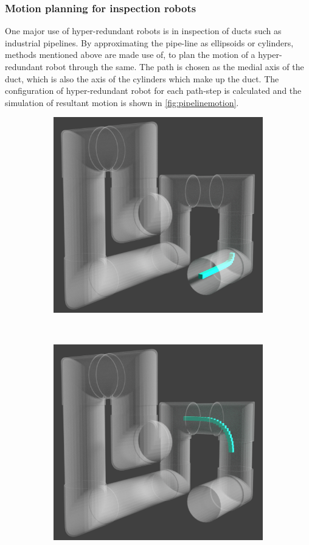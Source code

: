 \documentclass[12pt,a4]{article}
\begin{document}
\subsubsection{Motion planning for inspection robots}
One major use of hyper-redundant robots is in inspection of ducts such as industrial pipelines. By approximating the pipe-line as ellipsoids or cylinders, methods mentioned above are made use of, to plan the motion of a hyper-redundant robot through the same. The path is chosen as the medial axis of the duct, which is also the axis of the cylinders which make up the duct. The configuration of hyper-redundant robot for each path-step is calculated and the simulation of resultant motion is shown in \cref{fig:pipelinemotion}.
\begin{figure}[ht!]
    \centering
    \begin{subfigure}{0.31\textwidth}
        \centering
        \includegraphics[width=0.8\linewidth]{figures/Pipesnaps/1.png}
   
    \end{subfigure}%
    ~
        \begin{subfigure}{0.31\textwidth}
        \centering
        \includegraphics[width=0.8\linewidth]{figures/Pipesnaps/2.png}
       

\end{subfigure}
\end{figure}
\end{document}
